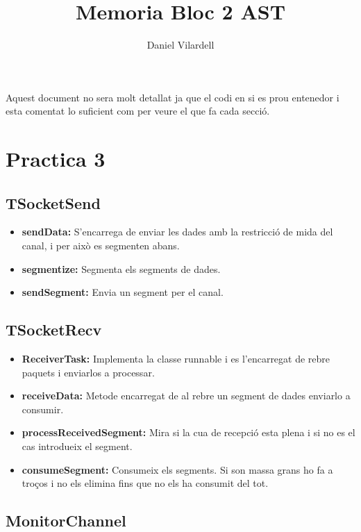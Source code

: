 \documentclass[12pt, a4papre]{article}
\author{Daniel Vilardell}
\title{Memoria Bloc 2 AST}
\date{}
\begin{document}
	\maketitle
	\tableofcontents
	\vspace{10mm}
	\begin{center}
		Aquest document no sera molt detallat ja que el codi en si es prou entenedor i esta comentat lo suficient com per veure el que fa cada secció.
	\end{center}
	\newpage
	\section{Practica 3}
	
	\subsection{TSocketSend}
	
	\begin{itemize}
		\item \textbf{sendData:} S'encarrega de enviar les dades amb la restricció de mida del canal, i per això es segmenten abans.
		\item  \textbf{segmentize:} Segmenta els segments de dades.
		\item  \textbf{sendSegment:} Envia un segment per el canal.
	\end{itemize}
	
	\subsection{TSocketRecv}
	
	\begin{itemize}
		\item \textbf{ReceiverTask:} Implementa la classe runnable i es l'encarregat de rebre paquets i enviarlos a processar. 
		\item  \textbf{receiveData:} Metode encarregat de al rebre un segment de dades enviarlo a consumir.
		\item  \textbf{processReceivedSegment:} Mira si la cua de recepció esta plena i si no es el cas introdueix el segment.
		\item  \textbf{consumeSegment:} Consumeix els segments. Si son massa grans ho fa a troços i no els elimina fins que no els ha consumit del tot.
	\end{itemize}
	
	\subsection{MonitorChannel} 
	
\end{document}
